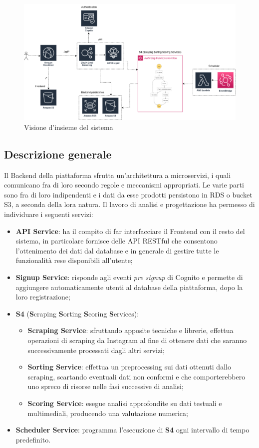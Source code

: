 \begin{figure}[!h]
    \includegraphics[width=16cm]{sezioni/images/overview.png}
    \centering
    \caption{Visione d'insieme del sistema}
\end{figure}

\subsection{Descrizione generale}
Il Backend della piattaforma sfrutta un'architettura a microservizi, i quali comunicano fra di loro secondo regole e meccanismi appropriati.
Le varie parti sono fra di loro indipendenti e i dati da esse prodotti persistono in RDS o bucket S3, a seconda della lora natura.
Il lavoro di analisi e progettazione ha permesso di individuare i seguenti servizi:
\begin{itemize}
    \item \textbf{API Service}: ha il compito di far interfacciare il Frontend con il resto del sistema, in particolare fornisce
    delle API RESTful che consentono l'ottenimento dei dati dal database e in generale di gestire tutte le funzionalità rese disponibili all'utente;
    \item \textbf{Signup Service}: risponde agli eventi \textit{pre signup} di Cognito e permette di aggiungere automaticamente utenti al database della piattaforma, dopo la loro registrazione;
    \item \textbf{S4} (\textbf{S}craping \textbf{S}orting \textbf{S}coring \textbf{S}ervices):
        \begin{itemize}
            \item \textbf{Scraping Service}: sfruttando apposite tecniche e librerie, effettua operazioni di scraping da Instagram al fine di ottenere dati che
            saranno successivamente processati dagli altri servizi;
            \item \textbf{Sorting Service}: effettua un preprocessing sui dati ottenuti dallo scraping, scartando eventuali dati non conformi e che comporterebbero
            uno spreco di risorse nelle fasi successive di analisi;
            \item \textbf{Scoring Service}: esegue analisi approfondite su dati testuali e multimediali, producendo una valutazione numerica; 
        \end{itemize}
    \item \textbf{Scheduler Service}: programma l'esecuzione di \textbf{S4} ogni intervallo di tempo predefinito.
\end{itemize}

